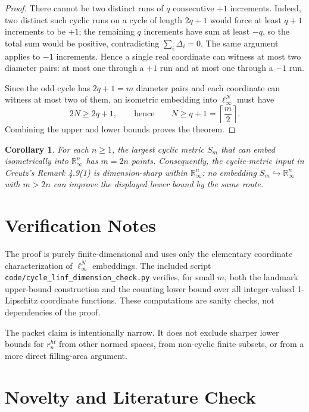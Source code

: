 \documentclass[11pt]{article}
\newtheorem{corollary}{Corollary}
\newcommand{\R}{\mathbb R}
\begin{document}
\begin{proof}
There cannot be two distinct runs of $q$ consecutive $+1$ increments. Indeed, two distinct such cyclic runs on a cycle of length $2q+1$ would force at least $q+1$ increments to be $+1$; the remaining $q$ increments have sum at least $-q$, so the total sum would be positive, contradicting $\sum_i\Delta_i=0$. The same argument applies to $-1$ increments. Hence a single real coordinate can witness at most two diameter pairs: at most one through a $+1$ run and at most one through a $-1$ run.

Since the odd cycle has $2q+1=m$ diameter pairs and each coordinate can witness at most two of them, an isometric embedding into $\ell_\infty^N$ must have
\[
  2N\geq 2q+1,
  \qquad\text{hence}\qquad
  N\geq q+1=\left\lceil\frac{m}{2}\right\rceil .
\]
Combining the upper and lower bounds proves the theorem.
\end{proof}

\begin{corollary}
\label{cor:creutz-cube-sharp}
For each $n\geq 1$, the largest cyclic metric $S_m$ that can embed isometrically into $\R_\infty^n$ has $m=2n$ points.
Consequently, the cyclic-metric input in Creutz's Remark 4.9(1) is dimension-sharp within $\R_\infty^n$: no embedding $S_m\hookrightarrow \R_\infty^n$ with $m>2n$ can improve the displayed lower bound by the same route.
\end{corollary}

\section*{Verification Notes}

The proof is purely finite-dimensional and uses only the elementary coordinate characterization of $\ell_\infty^N$ embeddings. The included script \texttt{code/cycle\_linf\_dimension\_check.py} verifies, for small $m$, both the landmark upper-bound construction and the counting lower bound over all integer-valued 1-Lipschitz coordinate functions. These computations are sanity checks, not dependencies of the proof.

The packet claim is intentionally narrow. It does not exclude sharper lower bounds for $r_n^{ht}$ from other normed spaces, from non-cyclic finite subsets, or from a more direct filling-area argument.

\section*{Novelty and Literature Check}
\end{document}
